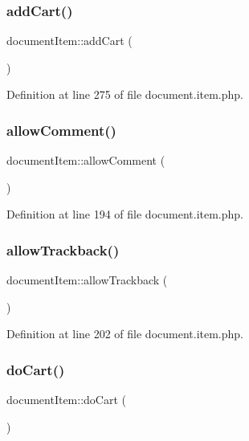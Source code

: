 \subsubsection{\texorpdfstring{add\+Cart()}{addCart()}}
{\footnotesize\ttfamily document\+Item\+::add\+Cart (\begin{DoxyParamCaption}{ }\end{DoxyParamCaption})}



Definition at line 275 of file document.\+item.\+php.

\hypertarget{classdocumentItem_a6d266a19a4703f5282b030d27e7e525a}{}\label{classdocumentItem_a6d266a19a4703f5282b030d27e7e525a} 
\subsubsection{\texorpdfstring{allow\+Comment()}{allowComment()}}
{\footnotesize\ttfamily document\+Item\+::allow\+Comment (\begin{DoxyParamCaption}{ }\end{DoxyParamCaption})}



Definition at line 194 of file document.\+item.\+php.

\hypertarget{classdocumentItem_a701624de548b08fd26b129bba0acbf3d}{}\label{classdocumentItem_a701624de548b08fd26b129bba0acbf3d} 
\subsubsection{\texorpdfstring{allow\+Trackback()}{allowTrackback()}}
{\footnotesize\ttfamily document\+Item\+::allow\+Trackback (\begin{DoxyParamCaption}{ }\end{DoxyParamCaption})}



Definition at line 202 of file document.\+item.\+php.

\hypertarget{classdocumentItem_abac6ff72ec8faf238215dedb1df85569}{}\label{classdocumentItem_abac6ff72ec8faf238215dedb1df85569} 
\subsubsection{\texorpdfstring{do\+Cart()}{doCart()}}
{\footnotesize\ttfamily document\+Item\+::do\+Cart (\begin{DoxyParamCaption}{ }\end{DoxyParamCaption})}



